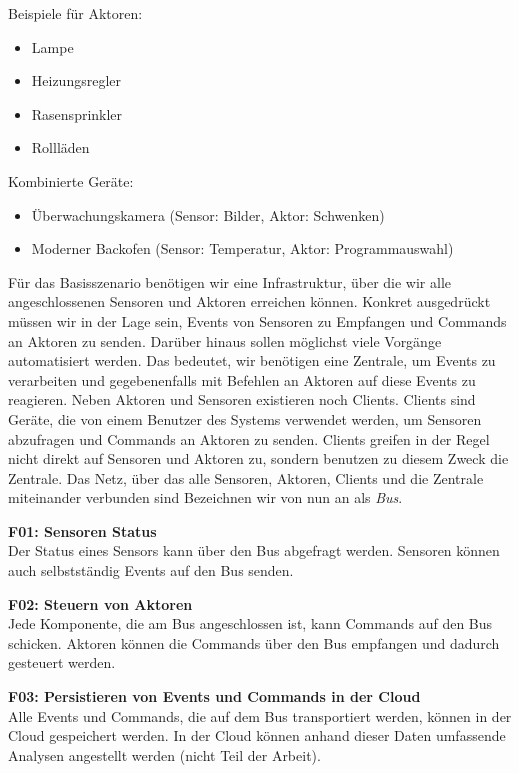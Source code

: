 Beispiele für Aktoren:

\begin{itemize}
	\item Lampe
	\item Heizungsregler
	\item Rasensprinkler
	\item Rollläden
\end{itemize}

Kombinierte Geräte:
\begin{itemize}
	\item Überwachungskamera (Sensor: Bilder, Aktor: Schwenken)
	\item Moderner Backofen (Sensor: Temperatur, Aktor: Programmauswahl)
\end{itemize}

Für das Basisszenario benötigen wir eine Infrastruktur, über die wir alle angeschlossenen Sensoren und Aktoren erreichen können. Konkret ausgedrückt müssen wir in der Lage sein, Events von Sensoren zu Empfangen und Commands an Aktoren zu senden. Darüber hinaus sollen möglichst viele Vorgänge automatisiert werden. Das bedeutet, wir benötigen eine Zentrale, um Events zu verarbeiten und gegebenenfalls mit Befehlen an Aktoren auf diese Events zu reagieren. Neben Aktoren und Sensoren existieren noch Clients. Clients sind Geräte, die von einem Benutzer des Systems verwendet werden, um Sensoren abzufragen und Commands an Aktoren zu senden. Clients greifen in der Regel nicht direkt auf Sensoren und Aktoren zu, sondern benutzen zu diesem Zweck die Zentrale. Das Netz, über das alle Sensoren, Aktoren, Clients und die Zentrale miteinander verbunden sind Bezeichnen wir von nun an als \textit{Bus}.

\textbf{F01: Sensoren Status} \\
Der Status eines Sensors kann über den Bus abgefragt werden. Sensoren können auch selbstständig Events auf den Bus senden.

\textbf{F02: Steuern von Aktoren} \\
Jede Komponente, die am Bus angeschlossen ist, kann Commands auf den Bus schicken. Aktoren können die Commands über den Bus empfangen und dadurch gesteuert werden. 

\textbf{F03: Persistieren von Events und Commands in der Cloud} \\
Alle Events und Commands, die auf dem Bus transportiert werden, können in der Cloud gespeichert werden. In der Cloud können anhand dieser Daten umfassende Analysen angestellt werden (nicht Teil der Arbeit).

